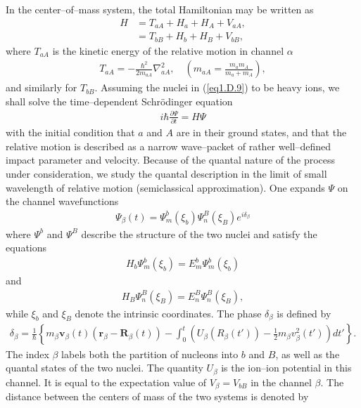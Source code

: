 \begin{subappendices}
In the center--of--mass system, the total Hamiltonian may be written as 
\begin{align}\label{eq1.D.10}
\nonumber H&=T_{aA}+H_a+H_A+V_{aA},\\
&=T_{bB}+H_b+H_B+V_{bB},
\end{align}
where $T_{aA}$ is the kinetic energy of the relative motion in channel $\alpha$
\begin{align}\label{eq1.D.11}
T_{aA}=-\frac{\hbar^2}{2m_{aA}}\nabla^2_{aA},\quad (m_{aA}=\frac{m_am_A}{m_a+m_A}),
\end{align}
and similarly for $T_{bB}$. Assuming the nuclei in (\ref{eq1.D.9}) to be heavy ions, we shall solve the time--dependent Schr\"odinger equation
\begin{align}\label{eq1.D.12}
i\hbar\frac{\partial\Psi}{\partial t}=H\Psi
\end{align}
with the initial condition that $a$ and $A$ are in their ground states, and that the relative motion is described as a narrow wave--packet of rather well--defined impact parameter and velocity. Because of the quantal nature of the process under consideration, we study the quantal description in the limit of small wavelength of relative motion (semiclassical approximation). One expands $\Psi$ on the channel wavefunctions
\begin{align}\label{eq1.D.13}
\Psi_\beta(t)=\Psi_m^b(\xi_b)\Psi_n^B(\xi_B)e^{i\delta_\beta}
\end{align}
where $\Psi^b$ and $\Psi^B$ describe the structure of the two nuclei and satisfy the equations 
\begin{align}\label{eq1.D.14}
H_b\Psi_m^b(\xi_b)=E_m^b\Psi_m^b(\xi_b)
\end{align}
and
\begin{align}\label{eq1.D.15}
H_B\Psi_n^B(\xi_B)=E_n^B\Psi_n^B(\xi_B),
\end{align}
while $\xi_b$ and $\xi_B$ denote the intrinsic coordinates. The phase $\delta_\beta$ is defined by
\begin{align}\label{eq1.D.16}
\delta_\beta=\frac{1}{\hbar}\left\{m_\beta\mathbf v_\beta(t)(\mathbf r_\beta-\mathbf R_\beta(t))-\int_0^t\left(U_\beta(R_\beta(t'))-\frac{1}{2}m_\beta v^2_\beta(t')\right)dt'\right\}.
\end{align}
The index $\beta$ labels both the partition of nucleons into $b$ and $B$, as well as the quantal states of the two nuclei. The quantity $U_\beta$ is the ion--ion potential in this channel. It is equal to the expectation value of $V_\beta=V_{bB}$ in the channel $\beta$. The distance between the centers of mass of the two systems is denoted by

\end{subappendices}
